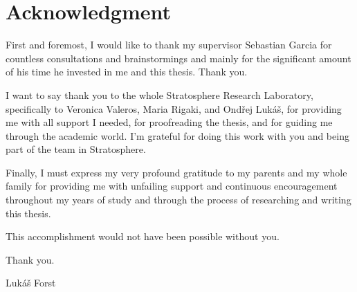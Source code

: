 \vspace*{\fill}

\section*{Acknowledgment}
First and foremost, I would like to thank my supervisor Sebastian Garcia for countless consultations and brainstormings and mainly for the significant amount of his time he invested in me and this thesis. Thank you.

I want to say thank you to the whole Stratosphere Research Laboratory, specifically to Veronica Valeros, Maria Rigaki, and Ondřej Lukáš, for providing me with all support I needed, for proofreading the thesis, and for guiding me through the academic world.
I'm grateful for doing this work with you and being part of the team in Stratosphere.

Finally, I must express my very profound gratitude to my parents and my whole family for providing me with unfailing support and continuous encouragement throughout my years of study and through the process of researching and writing this thesis. 

\bigskip \noindent
This accomplishment would not have been possible without you.
  
\bigskip \noindent
Thank you.
  
\bigskip \noindent
\hfill Lukáš Forst

\thispagestyle{empty}